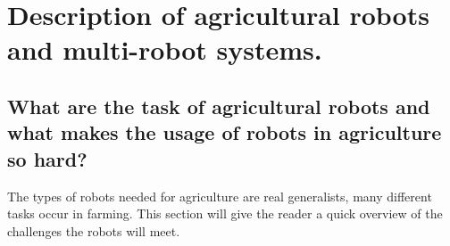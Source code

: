     




    
   





    \chapter{Description of agricultural robots and multi-robot systems.}

    \section{What are the task of agricultural robots and what makes the usage of robots in agriculture so hard?}


    The types of robots needed for agriculture are real generalists, many different tasks occur in farming. This section will give the reader a quick overview of the challenges the robots will meet.

